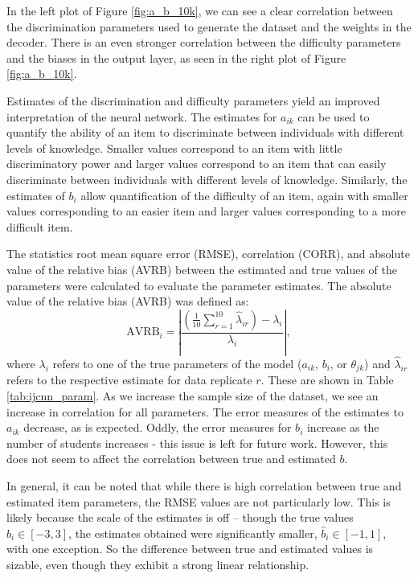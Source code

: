In the left plot of Figure \ref{fig:a_b_10k}, we can see a clear correlation between the discrimination parameters used to generate the dataset and the weights in the decoder. There is an even stronger correlation between the difficulty parameters and the biases in the output layer, as seen in the right plot of Figure \ref{fig:a_b_10k}.

Estimates of the discrimination and difficulty parameters yield an improved interpretation of the neural network. The estimates for $a_{ik}$ can be used to quantify the ability of an item to discriminate between individuals with different levels of knowledge. Smaller values correspond to an item with little discriminatory power and larger values correspond to an item that can easily discriminate between individuals with different levels of knowledge. Similarly, the estimates of $b_i$ allow quantification of the difficulty of an item, again with smaller values corresponding to an easier item and larger values corresponding to a more difficult item.

The statistics root mean square error (RMSE), correlation (CORR), and absolute value of the relative bias (AVRB) between the estimated and true values of the parameters were calculated to evaluate the parameter estimates. The absolute value of the relative bias (AVRB) was defined as: 
\begin{equation}
\text{AVRB}_i = \left| \frac{\left(\frac{1}{10} \sum_{r=1}^{10} \hat \lambda_{ir}\right) - \lambda_{i}}{\lambda_i} \right|,
\label{eq:replicates}
\end{equation}
where $\lambda_i$ refers to one of the true parameters of the model ($a_{ik}$, $b_i$, or $\theta_{jk}$) and $\hat \lambda_{ir}$ refers to the respective estimate for data replicate $r$. These are shown in Table \ref{tab:ijcnn_param}. As we increase the sample size of the dataset, we see an increase in correlation for all parameters. The error measures of the estimates to $a_{ik}$ decrease, as is expected. Oddly, the error measures for $b_i$ increase as the number of students increases - this issue is left for future work. However, this does not seem to affect the correlation between true and estimated $b$.

In general, it can be noted that while there is high correlation between true and estimated item parameters, the RMSE values are not particularly low. This is likely because the scale of the estimates is off -- though the true values $b_i \in [-3,3]$, the estimates obtained were significantly smaller, $\hat b_i \in [-1,1]$, with one exception. So the difference between true and estimated values is sizable, even though they exhibit a strong linear relationship.

